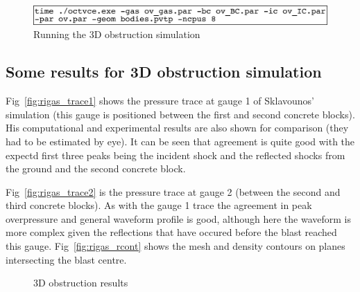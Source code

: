 \documentclass[pdftex, 12pt, a4paper]{report}
\begin{document}
\begin{figure}[htp]
\centering
\includegraphics[width=13cm]{pics/cmd_exe_rigas.jpg}
\caption{Running the 3D obstruction simulation}
\label{fig:rigas_run}
\end{figure}

\subsection{Some results for 3D obstruction simulation}\label{sec:Rigas_results}

Fig~\ref{fig:rigas_trace1} shows the pressure trace at gauge 1 of Sklavounos' simulation (this gauge is positioned between the
first and second concrete blocks).  His computational and experimental results are also shown for comparison (they had to
be estimated by eye).  It can be seen that agreement is quite good with the expectd first three peaks being the incident shock and
the reflected shocks from the ground and the second concrete block.

Fig~\ref{fig:rigas_trace2} is the pressure trace at gauge 2 (between the second and third concrete blocks).  As with the gauge 1 
trace the agreement in peak overpressure and general waveform profile is good, although here the waveform is more complex given 
the reflections that have occured before the blast reached this gauge.  Fig~\ref{fig:rigas_rcont} shows the mesh and 
density contours on planes intersecting the blast centre.  

\begin{figure}[htp]
  	\centering
	\caption{3D obstruction results}
	\label{fig:rigas_results}
\end{figure}


\end{document}
